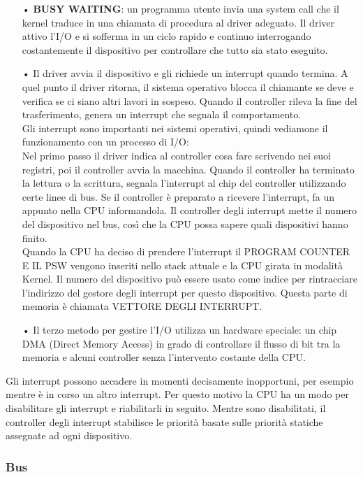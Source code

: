 \documentclass{article}
\begin{document}
\begin{enumerate}
   \item[•] \textbf{BUSY WAITING}: un programma utente invia una system call che il kernel traduce in una chiamata di procedura al driver adeguato. Il driver attivo l’I/O e si sofferma in un ciclo rapido e continuo interrogando costantemente il dispositivo per controllare che tutto sia stato eseguito.
   \item[•] Il driver avvia il dispositivo e gli richiede un interrupt quando termina. A quel punto il driver ritorna, il sistema operativo blocca il chiamante se deve e verifica se ci siano altri lavori in sospeso. Quando il controller rileva la fine del trasferimento, genera un interrupt che segnala il comportamento. 
\\Gli interrupt sono importanti nei sistemi operativi, quindi vediamone il funzionamento con un processo di I/O:
\\Nel primo passo il driver indica al controller cosa fare scrivendo nei suoi registri, poi il controller avvia la macchina. Quando il controller ha terminato la lettura o la scrittura, segnala l’interrupt al chip del controller utilizzando certe linee di bus. Se il controller è preparato a ricevere l’interrupt, fa un appunto nella CPU informandola. Il controller degli interrupt mette il numero del dispositivo nel bus, così che la CPU possa sapere quali dispositivi hanno finito.
\\Quando la CPU ha deciso di prendere l’interrupt il PROGRAM COUNTER E IL PSW vengono inseriti nello stack attuale e la CPU girata in modalità Kernel. Il numero del dispositivo può essere usato come indice per rintracciare l’indirizzo del gestore degli interrupt per questo dispositivo. Questa parte di memoria è chiamata VETTORE DEGLI INTERRUPT.
   \item[•] Il terzo metodo per gestire l’I/O utilizza un hardware speciale: un chip DMA (Direct Memory Access) in grado di controllare il flusso di bit tra la memoria e alcuni controller senza l’intervento costante della CPU.
\end{enumerate}
Gli interrupt possono accadere in momenti decisamente inopportuni, per esempio mentre è in corso un altro interrupt. Per questo motivo la CPU ha un modo per disabilitare gli interrupt e riabilitarli in seguito. Mentre sono disabilitati, il controller degli interrupt stabilisce le priorità basate sulle priorità statiche assegnate ad ogni dispositivo.

\subsubsection{Bus}
\end{document}
